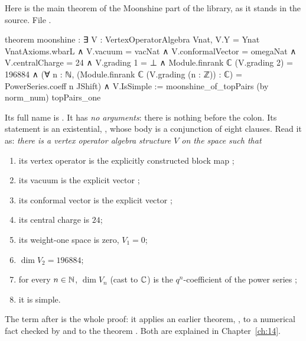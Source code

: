 Here is the main theorem of the Moonshine part of the library, as it stands in the source.
\noindent File .
\begin{leancode}
theorem moonshine :
    ∃ V : VertexOperatorAlgebra Vnat,
      V.Y = Ynat VnatAxioms.wbarL ∧ V.vacuum = vacNat ∧ V.conformalVector = omegaNat ∧
      V.centralCharge = 24 ∧
      V.grading 1 = ⊥ ∧
      Module.finrank ℂ (V.grading 2) = 196884 ∧
      (∀ n : ℕ, (Module.finrank ℂ (V.grading (n : ℤ)) : ℂ) = PowerSeries.coeff n JShift) ∧
      V.IsSimple :=
  moonshine_of_topPairs (by norm_num) topPairs_one
\end{leancode}
Its full name is . It has \emph{no arguments}: there is nothing
before the colon. Its statement is an existential, ,
whose body is a conjunction of eight clauses. Read it as: \emph{there is a vertex operator algebra
structure $V$ on the space  such that}
\begin{enumerate}[label=(\arabic*)]
\item its vertex operator is the explicitly constructed block map ;
\item its vacuum is the explicit vector ;
\item its conformal vector is the explicit vector ;
\item its central charge is $24$;
\item its weight-one space is zero, $V_1 = 0$;
\item $\dim V_2 = 196884$;
\item for every $n\in{\mathbb{N}}$, $\dim V_n$ (cast to ${\mathbb{C}}$) is the $q^n$-coefficient of the power series
  ;
\item it is simple.
\end{enumerate}
The term after \lean{:=} is the whole proof: it applies an earlier theorem,
, to a numerical fact checked by  and to the theorem
. Both are explained in Chapter~\ref{ch:14}.
